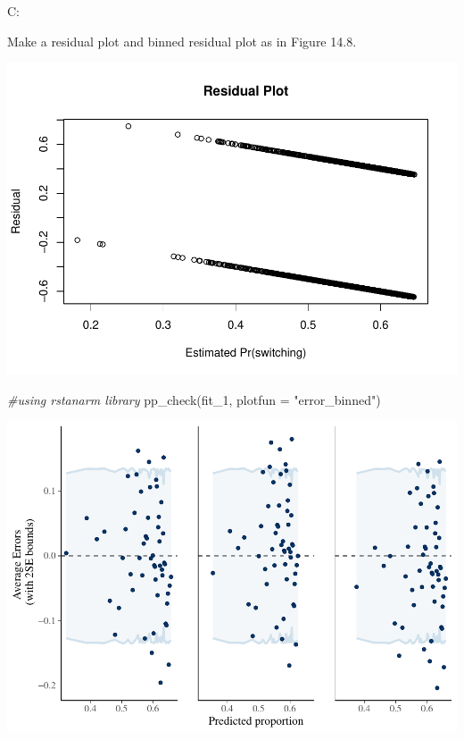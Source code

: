\documentclass[
]{article}
\newenvironment{Shaded}{\begin{snugshade}}{\end{snugshade}}
\newcommand{\AttributeTok}[1]{\textcolor[rgb]{0.77,0.63,0.00}{#1}}
\newcommand{\CommentTok}[1]{\textcolor[rgb]{0.56,0.35,0.01}{\textit{#1}}}
\newcommand{\FunctionTok}[1]{\textcolor[rgb]{0.00,0.00,0.00}{#1}}
\newcommand{\NormalTok}[1]{#1}
\newcommand{\SpecialCharTok}[1]{\textcolor[rgb]{0.00,0.00,0.00}{#1}}
\newcommand{\StringTok}[1]{\textcolor[rgb]{0.31,0.60,0.02}{#1}}
\begin{document}
C:

Make a residual plot and binned residual plot as in Figure 14.8.

\begin{Shaded}
\end{Shaded}

\includegraphics{14.3_files/figure-latex/unnamed-chunk-4-1.pdf}

\begin{Shaded}
\begin{Highlighting}[]
\CommentTok{\#using rstanarm library}
\FunctionTok{pp\_check}\NormalTok{(fit\_1, }\AttributeTok{plotfun =} \StringTok{"error\_binned"}\NormalTok{)}
\end{Highlighting}
\end{Shaded}

\includegraphics{14.3_files/figure-latex/unnamed-chunk-4-2.pdf}
\end{document}
